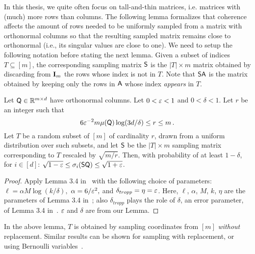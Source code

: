 %
In this thesis, we quite often focus on tall-and-thin matrices, i.e. matrices with (much) more rows than columns. The following lemma formalizes that coherence affects the amount of rows needed to be uniformly sampled from a matrix with orthonormal columns so that the resulting sampled matrix remains close to orthonormal (i.e., its singular values are close to one). We need to setup the following notation before stating the next lemma. Given a subset of indices $T \subseteq [m]$, the corresponding sampling matrix ${\mathsf{S} }$ is the $|T|\times m$ matrix obtained by discarding from $\mathbf{I}_{m}$ the rows whose index is not in $T$. Note that ${\mathsf{S} } {\mathsf{A} }$ is the matrix obtained by keeping only the rows in ${\mathsf{A} }$ whose index {\em appears} in $T$.
%
\begin{lemma}
\label{lemma:sampling-ortho}
Let ${\mathsf{Q} } \in \mathbb{R}^{m \times d}$ have orthonormal columns. Let $0 < \varepsilon < 1$ and $0 < \delta < 1$. Let $r$ be an integer such that
\[
6 \varepsilon^{-2} m  \mu({\mathsf{Q} }) \log (3d/\delta) \leq r \leq m \,.
\]
Let $T$ be a random subset of $[m]$ of cardinality $r$, drawn from a uniform distribution over such subsets, and let ${\mathsf{S} }$ be the $|T|\times m$ sampling matrix corresponding to $T$ rescaled by $\sqrt{m/r}$. Then, with probability of at least $1-\delta$, for $i\in[d]$: $  \sqrt{1-\varepsilon} \le \sigma_i({\mathsf{S} } {\mathsf{Q} }) \le  \sqrt{1+\varepsilon}$.
\end{lemma}
\begin{proof}
Apply Lemma 3.4 in~\cite{Tro11} with the following choice of parameters:
$\ell = \alpha M \log(k/\delta),$
$\alpha = 6/\varepsilon^2,$ and
$\delta_{tropp} = \eta = \varepsilon$.
Here, $\ell$, $\alpha$, $M$, $k$, $\eta$ are the parameters of  Lemma 3.4 in~\cite{Tro11};
also $\delta_{tropp}$ plays the role of $\delta$, an error parameter, of  Lemma 3.4 in~\cite{Tro11}.
$\varepsilon$ and $\delta$ are from our Lemma.
\end{proof}
In the above lemma, $T$ is obtained by sampling coordinates from $[m]$ \emph{without} replacement. Similar results can be shown for sampling with replacement, or using Bernoulli variables~\cite{LS:Ipsen12}.
